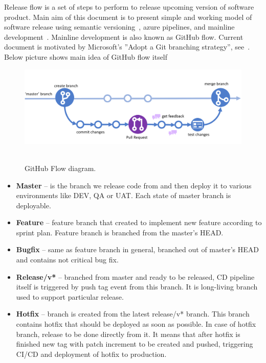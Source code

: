 Release flow is a set of steps to perform to release upcoming version of software product.
Main aim of this document is to present simple and working model of software release
using semantic versioning~\cite{SemanticVersioning}, azure pipelines,
and mainline development~\cite{MainlineDevelopment}.
Mainline development is also known as GitHub flow.
Current document is motivated by Microsoft's ''Adopt a Git branching strategy'', see~\cite{AdoptGitStrategy}.
Below picture shows main idea of GitHub flow itself
\begin{figure}[H]
    \centering
    \includegraphics[width=1\textwidth]{../img/GitHub_Flow}
    ~\caption{GitHub Flow diagram.}
\end{figure}
\begin{itemize}
    \item \textbf{Master} -- is the branch we release code from and then deploy it to various environments like
    DEV, QA or UAT. Each state of master branch is deployable.
    \item \textbf{Feature} -- feature branch that created to implement new feature according to sprint plan.
    Feature branch is branched from the master's HEAD\@.
    \item \textbf{Bugfix} -- same as feature branch in general, branched out of master's HEAD and contains not critical bug fix.
    \item \textbf{Release/v*} -- branched from master and ready to be released, CD pipeline itself is triggered
    by push tag event from this branch.
    It is long-living branch used to support particular release.
    \item \textbf{Hotfix} -- branch is created from the latest release/v* branch.
    This branch contains hotfix that should be deployed as soon as possible.
    In case of hotfix branch, release to be done directly from it.
    It means that after hotfix is finished new tag with patch increment to be created and pushed,
    triggering CI/CD and deployment of hotfix to production.
\end{itemize}

